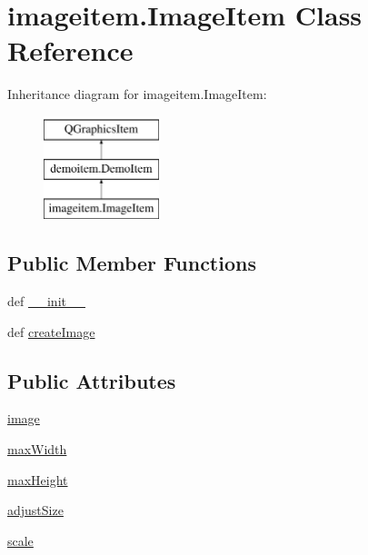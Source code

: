 \hypertarget{classimageitem_1_1ImageItem}{}\section{imageitem.\+Image\+Item Class Reference}
\label{classimageitem_1_1ImageItem}
Inheritance diagram for imageitem.\+Image\+Item\+:\begin{figure}[H]
\begin{center}
\leavevmode
\includegraphics[height=3.000000cm]{classimageitem_1_1ImageItem}
\end{center}
\end{figure}
\subsection*{Public Member Functions}
\begin{DoxyCompactItemize}
\item 
def \hyperlink{classimageitem_1_1ImageItem_abd3687e3947ffa400c6e596de4e3a2a2}{\+\_\+\+\_\+init\+\_\+\+\_\+}
\item 
def \hyperlink{classimageitem_1_1ImageItem_a4d160cdb1fd44d64ff38e64d7ee11362}{create\+Image}
\end{DoxyCompactItemize}
\subsection*{Public Attributes}
\begin{DoxyCompactItemize}
\item 
\hyperlink{classimageitem_1_1ImageItem_adcd1f63790c5d03c5deb81820edddb7f}{image}
\item 
\hyperlink{classimageitem_1_1ImageItem_a0de90d0ecb95ff1f3f82e14e49f398e6}{max\+Width}
\item 
\hyperlink{classimageitem_1_1ImageItem_acb32e64acff6ea72a2898c2953ced6b0}{max\+Height}
\item 
\hyperlink{classimageitem_1_1ImageItem_a78f134815c4f6da8d938a5b7751d4076}{adjust\+Size}
\item 
\hyperlink{classimageitem_1_1ImageItem_a6b1b2f0e0af2323821f4eec7fdcc7c1d}{scale}
\end{DoxyCompactItemize}
